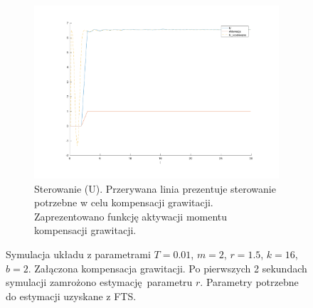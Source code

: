 \documentclass[a4paper, 10pt]{article}
\begin{document}
\begin{figure}
	\begin{subfigure}{.5\textwidth}
		\centering
		\includegraphics[width=\linewidth]{mrozenie_u}
		\caption{Sterowanie (U). Przerywana linia prezentuje sterowanie potrzebne w celu kompensacji grawitacji. Zaprezentowano funkcję aktywacji momentu kompensacji grawitacji.}
		\label{fig:mrozenie_u}
	\end{subfigure}

	\caption{Symulacja układu z parametrami $T=0.01$, $m = 2$, $r = 1.5$, $k = 16$, $b = 2$. Załączona kompensacja grawitacji. Po pierwszych 2 sekundach symulacji zamrożono estymację parametru $r$. Parametry potrzebne do estymacji uzyskane z FTS.}
	\label{fig:mrozenie}
\end{figure}
\end{document}
